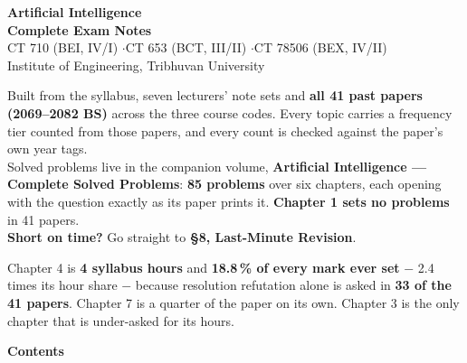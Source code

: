 \documentclass[10pt]{article}
\begin{document}
\thispagestyle{empty}
\vspace*{2.0cm}
\begin{center}
  {\Huge\bfseries\color{acc} Artificial Intelligence}\\[6pt]
  {\LARGE\bfseries Complete Exam Notes}\\[14pt]
  {\large\color{sub} CT 710 (BEI, IV/I) \quad$\cdot$\quad CT 653 (BCT, III/II)
   \quad$\cdot$\quad CT 78506 (BEX, IV/II)}\\[3pt]
  {\color{sub} Institute of Engineering, Tribhuvan University}\\[20pt]
  \begin{minipage}{0.78\textwidth}
    \color{sub}\small
    Built from the syllabus, seven lecturers' note sets and \textbf{all 41 past papers
    (2069--2082 BS)} across the three course codes. Every topic carries a frequency tier
    counted from those papers, and every count is checked against the paper's own year
    tags.\\[8pt]
    Solved problems live in the companion volume,
    \textbf{Artificial Intelligence --- Complete Solved Problems}: \textbf{85 problems}
    over six chapters, each opening with the question exactly as its paper prints it.
    \textbf{Chapter 1 sets no problems} in 41 papers.\\[8pt]
    \textbf{Short on time?} Go straight to \textbf{\S8, Last-Minute Revision}.
  \end{minipage}
\end{center}

\vfill


\par{}\vspace{10pt}
\begin{center}
\begin{minipage}{0.86\textwidth}\small\color{sub}
 Chapter 4 is
\textbf{4 syllabus hours} and \textbf{18.8\,\% of every mark ever set} $-$ 2.4 times its
hour share $-$ because resolution refutation alone is asked in \textbf{33 of the 41
papers}. Chapter 7 is a quarter of the paper on its own. Chapter 3 is the only chapter
that is under-asked for its hours.
\end{minipage}
\end{center}
\vspace{1.2cm}

\cleardoublepage
\pagestyle{fancy}
{\Large\bfseries\color{acc} Contents}
\vspace{-6pt}{\color{acc}\rule{\textwidth}{1.1pt}}\vspace{4pt}
\begingroup
\renewcommand{\contentsname}{}
\setcounter{tocdepth}{1}
\vspace{-24pt}
\tableofcontents
\endgroup
\end{document}
